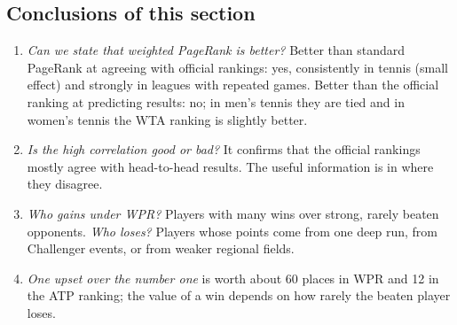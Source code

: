 \documentclass[11pt]{article}
\begin{document}
\subsection{Conclusions of this section}
\begin{enumerate}
\item \emph{Can we state that weighted PageRank is better?} Better than standard PageRank at agreeing with official rankings: yes, consistently in tennis (small effect) and strongly in leagues with repeated games. Better than the official ranking at predicting results: no; in men's tennis they are tied and in women's tennis the WTA ranking is slightly better.
\item \emph{Is the high correlation good or bad?} It confirms that the official rankings mostly agree with head-to-head results. The useful information is in where they disagree.
\item \emph{Who gains under WPR?} Players with many wins over strong, rarely beaten opponents. \emph{Who loses?} Players whose points come from one deep run, from Challenger events, or from weaker regional fields.
\item \emph{One upset over the number one} is worth about 60 places in WPR and 12 in the ATP ranking; the value of a win depends on how rarely the beaten player loses.
\end{enumerate}



\end{document}
